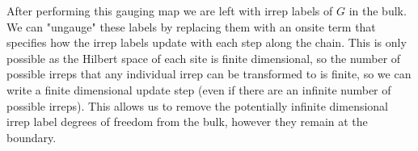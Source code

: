 \documentclass[aps,prx,twocolumn,floatfix,10pt,amssymb,amsfont,amsmath,superscriptaddress,float,nofootinbib,longbibliography,nobalancelastpage]{revtex4-2}
\begin{document}
After performing this gauging map we are left with irrep labels of $G$ in the bulk. We can "ungauge" these labels by replacing them with an onsite term that specifies how the irrep labels update with each step along the chain. This is only possible as the Hilbert space of each site is finite dimensional, so the number of possible irreps that any individual irrep can be transformed to is finite, so we can write a finite dimensional update step (even if there are an infinite number of possible irreps). This allows us to remove the potentially infinite dimensional irrep label degrees of freedom from the bulk, however they remain at the boundary.
\end{document}
